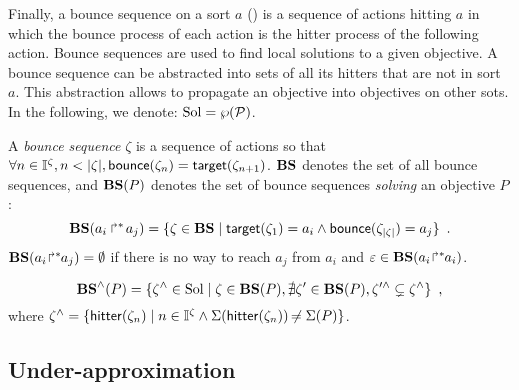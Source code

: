 Finally, a bounce sequence on a sort $a$ () is a sequence of actions hitting $a$
in which the bounce process of each action is the hitter process of the following action.
Bounce sequences are used to find local solutions to a given objective.
A bounce sequence can be abstracted into sets of all its hitters that are not in sort $a$.
This abstraction allows to propagate an objective into objectives on other sots.
In the following, we denote: $\mathrm{Sol} = \wp(\mathcal{P})$.
\begin{definition}
\label{def:bs}
  A \emph{bounce sequence} $\zeta$ is a sequence of actions so that $\forall n \in \mathbb{I}^{\zeta}, n < |\zeta|, \mathsf{bounce}(\zeta_{n}) = \mathsf{target}(\zeta_{n+1})$.
  $\mathbf{BS}$ denotes the set of all bounce sequences, and
  $\mathbf{BS}(P)$ denotes the set of bounce sequences \emph{solving} an objective $P$:
  \[
    \mathbf{BS}(\mbox{$a_i\Rsh^*\!a_j$}) = \{ \zeta \in \mathbf{BS} \mid \mathsf{target}(\zeta_1)= a_i \wedge \mathsf{bounce}(\zeta_{|\zeta|}) = a_j \} \enspace.
  \]
  $\mathbf{BS}({a_i\!\Rsh^*\!\!a_j}) = \emptyset$ if there is no way to reach $a_j$ from $a_i$ and $\varepsilon \in \mathbf{BS}({a_i\!\Rsh^*\!\!a_i})$.
\end{definition}
%
\begin{definition}[$\aBS:\Obj \rightarrow \powerset(\Sol)$]
\label{def:aBS}
  \[
    \mathbf{BS}^\wedge(P) = \{ \zeta^\wedge \in \mathrm{Sol} \mid \zeta \in \mathbf{BS}(P), \nexists \zeta' \in \mathbf{BS}(P), \zeta'^\wedge \subsetneq \zeta^\wedge \} \enspace,
  \]
  where $\zeta^\wedge = \{ \mathsf{hitter}(\zeta_n) \mid  n \in \mathbb{I}^{\zeta} \wedge \Sigma(\mathsf{hitter}(\zeta_n)) \not\nobreak\mkern -2mu = \Sigma(P) \}$.
\end{definition}



\subsection{Under-approximation}

